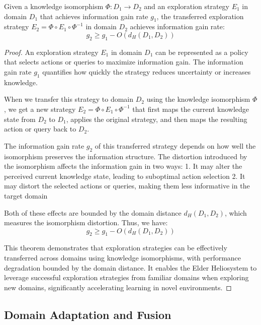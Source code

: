\begin{theorem}
Given a knowledge isomorphism $\Phi: D_1 \to D_2$ and an exploration strategy $E_1$ in domain $D_1$ that achieves information gain rate $g_1$, the transferred exploration strategy $E_2 = \Phi \circ E_1 \circ \Phi^{-1}$ in domain $D_2$ achieves information gain rate:
\begin{equation}
g_2 \geq g_1 - O(d_H(D_1, D_2))
\end{equation}
\end{theorem}

\begin{proof}
An exploration strategy $E_1$ in domain $D_1$ can be represented as a policy that selects actions or queries to maximize information gain. The information gain rate $g_1$ quantifies how quickly the strategy reduces uncertainty or increases knowledge.

When we transfer this strategy to domain $D_2$ using the knowledge isomorphism $\Phi$, we get a new strategy $E_2 = \Phi \circ E_1 \circ \Phi^{-1}$ that first maps the current knowledge state from $D_2$ to $D_1$, applies the original strategy, and then maps the resulting action or query back to $D_2$.

The information gain rate $g_2$ of this transferred strategy depends on how well the isomorphism preserves the information structure. The distortion introduced by the isomorphism affects the information gain in two ways:
1. It may alter the perceived current knowledge state, leading to suboptimal action selection
2. It may distort the selected actions or queries, making them less informative in the target domain

Both of these effects are bounded by the domain distance $d_H(D_1, D_2)$, which measures the isomorphism distortion. Thus, we have:
\begin{equation}
g_2 \geq g_1 - O(d_H(D_1, D_2))
\end{equation}

This theorem demonstrates that exploration strategies can be effectively transferred across domains using knowledge isomorphisms, with performance degradation bounded by the domain distance. It enables the Elder Heliosystem to leverage successful exploration strategies from familiar domains when exploring new domains, significantly accelerating learning in novel environments.
\end{proof}

\subsection{Domain Adaptation and Fusion}

